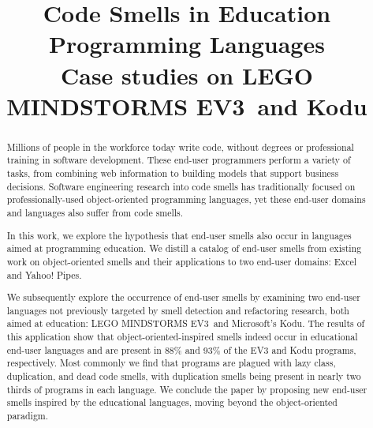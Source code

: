 \documentclass[conference]{IEEEtran}
\newcommand{\ms}{LEGO MINDSTORMS EV3}
\begin{document}
\title{Code Smells in Education Programming Languages \large{\\Case studies on \ms~and Kodu}}


\author{
\and
{}
\and
{}
}



\maketitle

\begin{abstract}
Millions of people in the workforce today write code, without degrees or professional training in software development. These end-user programmers perform a variety of tasks, from combining web information to building models that support business decisions. Software engineering research into code smells has traditionally focused on professionally-used object-oriented programming languages, yet these end-user domains and languages also suffer from code smells. 

In this work, we explore the hypothesis that end-user smells also occur in languages aimed at programming education. We distill a catalog of end-user smells from existing work on object-oriented smells and their applications to two end-user domains: Excel and Yahoo! Pipes.

We subsequently explore the occurrence of end-user smells by examining two end-user languages not previously targeted by smell detection and refactoring research, both aimed at education: \ms~and Microsoft's Kodu. The results of this application show that object-oriented-inspired smells indeed occur in educational end-user languages and are present in 88\% and 93\% of the EV3 and Kodu programs, respectively. Most commonly we find that programs are plagued with lazy class, duplication, and dead code smells, with duplication smells being present in nearly two thirds of programs in each language. We conclude the paper by proposing new end-user smells inspired by the educational languages, moving beyond the object-oriented paradigm. 
\end{abstract}
\end{document}
